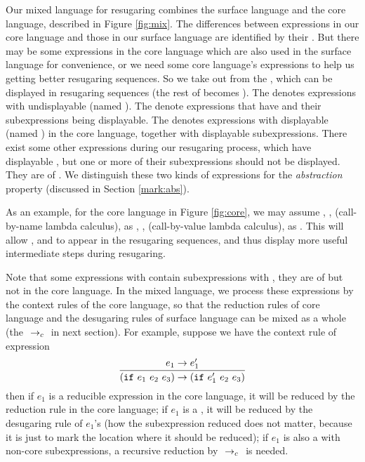 Our mixed language for resugaring combines the surface language and the core language, described in Figure \ref{fig:mix}.
%
The differences between expressions in our core language and those in our surface language are identified by their . But there may be some expressions in the core language which are also used in the surface language for convenience, or we need some core language's expressions to help us getting better resugaring sequences. So we take  out from the , which can be displayed in resugaring sequences (the rest of  becomes ). The  denotes expressions with undisplayable  (named ). The  denote expressions that have  and their subexpressions being displayable. The  denotes expressions with displayable  (named ) in the core language, together with displayable subexpressions. There exist some other expressions during our resugaring process, which have displayable , but one or more of their subexpressions should not be displayed. They are of . We distinguish these two kinds of expressions for the \emph{abstraction} property (discussed in Section \ref{mark:abs}).

As an example, for the core language in Figure \ref{fig:core},
we may assume , ,  (call-by-name lambda calculus),  as , ,  (call-by-value lambda calculus),  as . This will allow ,  and  to appear in the resugaring sequences, and thus display more useful intermediate steps during resugaring.

Note that some expressions with  contain subexpressions with , they are of  but not in the core language. In the mixed language, we process these expressions by the context rules of the core language, so that the reduction rules of core language and the desugaring rules of surface language can be mixed as a whole (the $~\rightarrow_c~$ in next section). For example, suppose we have the context rule of  expression
\[
\infer{(\m{if}~e_1~e_2~e_3) \rightarrow (\m{if}~e_1'~e_2~e_3)}{e_1 \rightarrow e_1'}
\]
then if $e_1$ is a reducible expression in the core language, it will be reduced by the reduction rule in the core language; if $e_1$ is a , it will be reduced by the desugaring rule of $e_1$'s  (how the subexpression reduced does not matter, because it is just to mark the location where it should be reduced); if $e_1$ is also a  with non-core subexpressions, a recursive reduction by $~\rightarrow_c~$ is needed.



